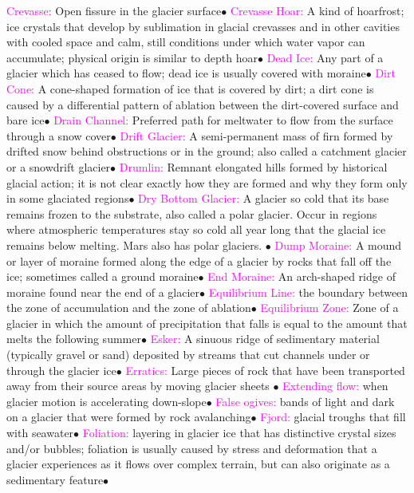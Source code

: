 \documentclass{article}
\newcommand{\ddd}{$\bullet$}
\newcommand{\pink}[1]{\textcolor{magenta}{#1}}
\newcommand{\vocab}[1]{{\pink{#1}}}
\begin{document}
\begin{multicols*}{4}
		\vocab{        Crevasse: } Open fissure in the glacier surface\ddd
		\vocab{        Crevasse Hoar: } A kind of hoarfrost; ice crystals that develop by sublimation in glacial crevasses and in other cavities with cooled space and calm, still conditions under which water vapor can accumulate; physical origin is similar to depth hoar\ddd
		\vocab{        Dead Ice: } Any part of a glacier which has ceased to flow; dead ice is usually covered with moraine\ddd
		\vocab{        Dirt Cone: } A cone-shaped formation of ice that is covered by dirt; a dirt cone is caused by a differential pattern of ablation between the dirt-covered surface and bare ice\ddd
		\vocab{        Drain Channel: } Preferred path for meltwater to flow from the surface through a snow cover\ddd
		\vocab{        Drift Glacier: } A semi-permanent mass of firn formed by drifted snow behind obstructions or in the ground; also called a catchment glacier or a snowdrift glacier\ddd
		\vocab{        Drumlin: } Remnant elongated hills formed by historical glacial action; it is not clear exactly how they are formed and why they form only in some glaciated regions\ddd
		\vocab{Dry Bottom Glacier: } A glacier so cold that its base remains frozen to the substrate, also called a polar glacier. Occur in regions where atmospheric temperatures stay so cold all year long that the glacial ice remains below melting. Mars also has polar glaciers. \ddd
		\vocab{        Dump Moraine: } A mound or layer of moraine formed along the edge of a glacier by rocks that fall off the ice; sometimes called a ground moraine\ddd
		\vocab{        End Moraine: } An arch-shaped ridge of moraine found near the end of a glacier\ddd
		\vocab{Equilibrium Line: }the boundary between the zone of accumulation and the zone of ablation\ddd
		\vocab{        Equilibrium Zone: } Zone of a glacier in which the amount of precipitation that falls is equal to the amount that melts the following summer\ddd
		\vocab{        Esker: } A sinuous ridge of sedimentary material (typically gravel or sand) deposited by streams that cut channels under or through the glacier ice\ddd
		\vocab{Erratics: } Large pieces of rock that have been transported away from their source areas by moving glacier sheets \ddd
		\vocab{        Extending flow: } when glacier motion is accelerating down-slope\ddd
		\vocab{        False ogives: } bands of light and dark on a glacier that were formed by rock avalanching\ddd
		\vocab{        Fjord: } glacial troughs that fill with seawater\ddd
		\vocab{        Foliation: } layering in glacier ice that has distinctive crystal sizes and/or bubbles; foliation is usually caused by stress and deformation that a glacier experiences as it flows over complex terrain, but can also originate as a sedimentary feature\ddd

\end{multicols*}
\end{document}

